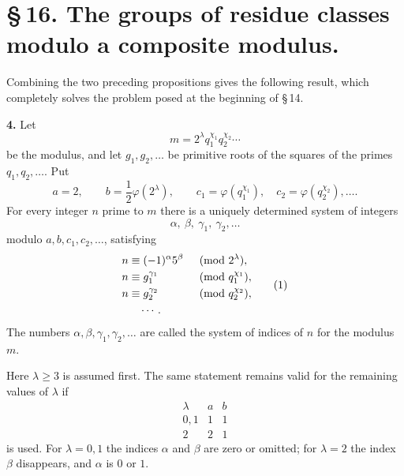 \documentclass[11pt]{article}
\begin{document}

\section*{\S\,16. The groups of residue classes modulo a composite modulus.}

Combining the two preceding propositions gives the following result, which completely solves the problem posed at the beginning of \S\,14.

\medskip
\noindent\textbf{4.} Let
\begin{equation}
 m=2^\lambda q_1^{\chi_1}q_2^{\chi_2}\cdots
\end{equation}
be the modulus, and let $g_1,g_2,\ldots$ be primitive roots of the squares of the primes $q_1,q_2,\ldots$. Put
\[
 a=2,
 \qquad b=\frac12\varphi(2^\lambda),
 \qquad c_1=\varphi(q_1^{\chi_1}),\quad c_2=\varphi(q_2^{\chi_2}),\ldots.
\]
For every integer $n$ prime to $m$ there is a uniquely determined system of integers
\[
 \alpha,\ \beta,\ \gamma_1,\ \gamma_2,
\ldots
\]
modulo $a,b,c_1,c_2,
\ldots$, satisfying
\begin{equation}
\begin{aligned}
 n&\equiv (-1)^\alpha 5^\beta &&\pmod {2^\lambda},\\
 n&\equiv g_1^{\gamma_1} &&\pmod {q_1^{\chi_1}},\\
 n&\equiv g_2^{\gamma_2} &&\pmod {q_2^{\chi_2}},\\
 &\hspace{1.0em}\cdots.
\end{aligned}
\tag{1}
\end{equation}
The numbers $\alpha,\beta,\gamma_1,\gamma_2,
\ldots$ are called the system of indices of $n$ for the modulus $m$.

Here $\lambda\ge3$ is assumed first. The same statement remains valid for the remaining values of $\lambda$ if
\[
\begin{array}{c|cc}
\lambda& a&b\\ \hline
0,1&1&1\\
2&2&1
\end{array}
\]
is used. For $\lambda=0,1$ the indices $\alpha$ and $\beta$ are zero or omitted; for $\lambda=2$ the index $\beta$ disappears, and $\alpha$ is $0$ or $1$.
\end{document}
